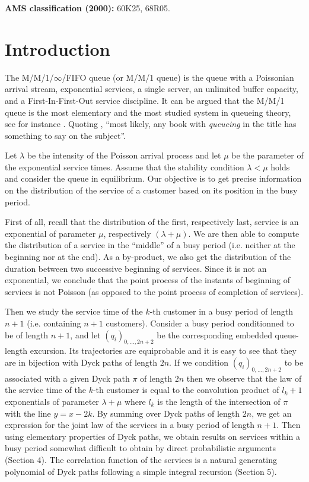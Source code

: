 \documentclass[11pt,a4paper]{article}
\numberwithin{equation}{section}
\newcommand{\1}{\mathbbm{1}}
\begin{document}
\smallskip

{\noindent\bf AMS classification (2000):} 60K25, 68R05.




\section{Introduction}

The M/M/1/$\infty$/FIFO queue (or M/M/1 queue) is the queue with a
Poissonian arrival stream, exponential services, a single server,
an unlimited buffer capacity, and a First-In-First-Out service
discipline. It can be argued that the M/M/1 queue is
the most elementary and the most studied system in queueing theory,
see for instance \cite{cohe82,taka,robe,ScWe}. Quoting \cite{ScWe},
``most likely, any book with {\em queueing} in the title has something
to say on the subject''.

Let $\lambda$ be the intensity of the Poisson arrival process and let
$\mu$ be the parameter of the exponential service times. Assume that
the stability condition $\lambda < \mu$ holds and consider the queue
in equilibrium. Our objective is to get precise information on the
distribution of the service of a customer based on its position  in
the busy period.


First of all, recall that the distribution of the first, respectively
last,  service is an
exponential of parameter $\mu$, respectively $(\lambda+\mu)$.
We are then able
to compute the distribution of a service in the ``middle''
of a busy period (i.e. neither at the beginning nor at the end).
As a by-product, we also get the distribution of the duration between
two successive beginning of services. Since it is not an exponential,
we conclude that the point process of
the instants of beginning of services is not Poisson (as opposed to the point process
of completion of services).

Then we study the service time of the $k$-th customer in a busy period of length $n+1$
(i.e. containing $n+1$ customers). Consider a busy period conditionned to be of length $n+1$,
and let $(q_i)_{0,\dots,2n+2}$ be the corresponding embedded queue-length excursion.
Its trajectories are equiprobable and it is easy to see that they are in bijection with Dyck paths of length $2n$.
If we condition $(q_i)_{0,\dots,2n+2}$ to be associated with a given Dyck path $\pi$ of length $2n$ then we observe
that the law of the service time of the $k$-th customer is equal to the convolution product of $l_k+1$ exponentials
of parameter $\lambda+\mu$ where $l_k$ is the length of the intersection of $\pi$ with the line $y=x-2k$.
By summing over Dyck paths of length $2n$, we get an expression for the joint law of the services in a busy period of length $n+1$.
Then using elementary properties of Dyck paths, we obtain results on services within a busy period somewhat difficult to obtain
by direct probabilistic arguments (Section 4). The correlation function of the services is a natural generating polynomial of
Dyck paths following a simple integral recursion (Section 5).
\end{document}
